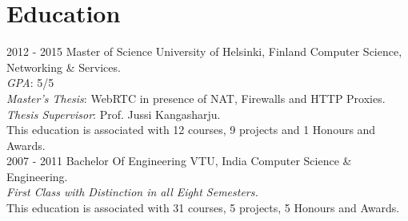 \documentclass[]{friggeri-cv}
\begin{document}
\section{Education}
\begin{entrylist}
  \entry
    {2012 - 2015}
    {Master of Science}
    {\Large{University of Helsinki, Finland}}
    {Computer Science, Networking \& Services.\\
     \emph{GPA}: 5/5 \\
     \emph{Master's Thesis}: WebRTC in presence of NAT, Firewalls and HTTP Proxies.\\
     \emph{Thesis Supervisor}: Prof. Jussi Kangasharju.\\
     This education is associated with 12 courses, 9 projects and 1 Honours and Awards.\\}
  \entry
    {2007 - 2011}
    {Bachelor Of Engineering}
    {\Large{VTU, India}}
    {Computer Science \& Engineering.\\
    \emph{First Class with Distinction in all Eight Semesters.}\\
    This education is associated with 31 courses, 5 projects, 5 Honours and Awards.\\}
\end{entrylist}
\end{document}
